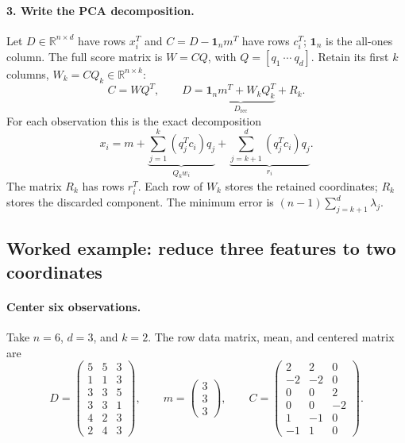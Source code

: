 \documentclass[11pt]{article}
\newcommand{\R}{\mathbb R}
\begin{document}
\paragraph{3. Write the PCA decomposition.}
Let $D\in\R^{n\times d}$ have rows $x_i^T$ and
$C=D-\mathbf1_n m^T$ have rows $c_i^T$; $\mathbf1_n$ is the all-ones column.
The full score matrix is $W=CQ$, with $Q=[q_1\ \cdots\ q_d]$.
Retain its first $k$ columns, $W_k=CQ_k\in\R^{n\times k}$:
\[
 \boxed{C=WQ^T,\qquad
 D=\underbrace{\mathbf1_n m^T+W_kQ_k^T}_{D_{\mathrm{rec}}}+R_k.}
\]
For each observation this is the exact decomposition
\[
 x_i=m+\underbrace{\sum_{j=1}^k(q_j^Tc_i)q_j}_{Q_kw_i}
       +\underbrace{\sum_{j=k+1}^d(q_j^Tc_i)q_j}_{r_i}.
\]
The matrix $R_k$ has rows $r_i^T$. Each row of $W_k$ stores the retained
coordinates; $R_k$ stores the discarded component. The minimum error is
\mbox{$(n-1)\sum_{j=k+1}^d\lambda_j$}.

\newpage
\subsection*{Worked example: reduce three features to two coordinates}
\paragraph{Center six observations.}
Take $n=6$, $d=3$, and $k=2$. The row data matrix, mean, and centered matrix are
\[
 D=\begin{pmatrix}
 5&5&3\\1&1&3\\3&3&5\\3&3&1\\4&2&3\\2&4&3
 \end{pmatrix},\qquad
 m=\begin{pmatrix}3\\3\\3\end{pmatrix},\qquad
 C=\begin{pmatrix}
 2&2&0\\-2&-2&0\\0&0&2\\0&0&-2\\1&-1&0\\-1&1&0
 \end{pmatrix}.
\]
\end{document}
